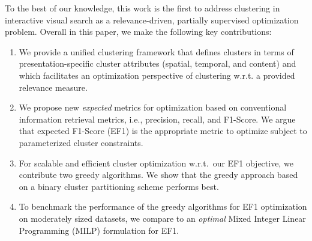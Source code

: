 To the best of our knowledge, this work is the first to address clustering in interactive visual search as a relevance-driven, partially supervised optimization problem.
Overall in this paper, we make the following key contributions:
\begin{enumerate}
\item We provide a unified clustering framework that defines clusters in terms of presentation-specific cluster attributes (spatial, temporal, and content) and which facilitates an optimization perspective of clustering w.r.t. a provided relevance measure.  
\item We propose new \emph{expected} metrics for optimization based on conventional information retrieval metrics, i.e., precision, recall, and F1-Score.  We argue that expected F1-Score (EF1) is the appropriate metric to optimize subject to parameterized cluster constraints.
\item For scalable and efficient cluster optimization w.r.t.\ our EF1 objective, we contribute two greedy algorithms.  We show that the greedy approach based on a binary cluster partitioning scheme performs best.
\item To benchmark the performance of the greedy algorithms for EF1 optimization on moderately sized datasets, we compare to an \emph{optimal} Mixed Integer Linear Programming (MILP) formulation for EF1.

\end{enumerate}
